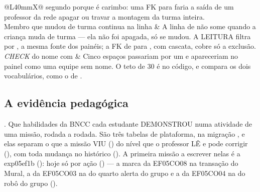 \begin{tabularx}{\linewidth}{@{}L{40mm}X@{}}
  segundo porque é carimbo: uma FK para  faria a saída de um professor
  da rede apagar ou travar a montagem da turma inteira.\\
\zebra Membro que mudou de turma continua na linha & A linha de
   não some quando a criança muda de turma --- ela não foi
  apagada, só se mudou. A LEITURA filtra por , a mesma fonte
  dos painéis; a FK de  para , com cascata, cobre só
  a exclusão.\\
\emph{CHECK} do nome com  & Cinco espaços passariam por um
   e apareceriam no painel como uma equipe sem nome. O teto de 30 é
   no código, e  compara os
  dois vocabulários, como o de .\\
\bottomrule
\end{tabularx}

\subsection{A evidência pedagógica}
\label{sec:evidencias}

. Que habilidades da BNCC cada estudante DEMONSTROU numa atividade
de uma missão, rodada a rodada. São três tabelas de plataforma, na migração
, e elas separam o que a missão
VIU () do nível que o professor LÊ e pode corrigir
(), com toda mudança no histórico (). A
primeira missão a escrever nelas é a exp05ef1b (): hoje só por
ação () --- a marca da EF05CO08 na transação do Mural, a da
EF05CO03 na do quarto alerta do grupo e a da EF05CO04 na do robô do grupo
().

